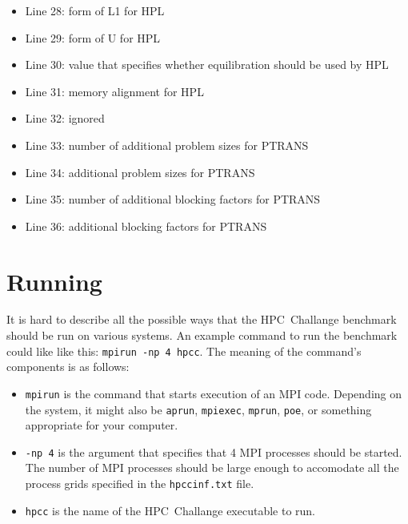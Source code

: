 \documentclass[twocolumn]{article}
\begin{document}
\begin{itemize}
\item Line 28: form of L1 for HPL
\item Line 29: form of U for HPL
\item Line 30: value that specifies whether equilibration should be used by HPL
\item Line 31: memory alignment for HPL
\item Line 32: ignored
\item Line 33: number of additional problem sizes for PTRANS
\item Line 34: additional problem sizes for PTRANS
\item Line 35: number of additional blocking factors for PTRANS
\item Line 36: additional blocking factors for PTRANS
\end{itemize}

\section{Running}
It is hard to describe all the possible ways that the HPC~Challange
benchmark should be run on various systems.  An example command to run
the benchmark could like like this: \texttt{mpirun -np 4 hpcc}. The
meaning of the command's components is as follows:
\begin{itemize}
\item \texttt{mpirun} is the command that starts execution of an MPI
code. Depending on the system, it might also be \texttt{aprun},
\texttt{mpiexec}, \texttt{mprun}, \texttt{poe}, or something
appropriate for your computer.

\item \texttt{-np 4} is the argument that specifies that 4 MPI
processes should be started. The number of MPI processes should be
large enough to accomodate all the process grids specified in the
\texttt{hpccinf.txt} file.

\item \texttt{hpcc} is the name of the HPC~Challange executable to
run.
\end{itemize}
\end{document}
